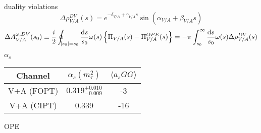 \documentclass{article}
\begin{document}
  duality violations
  \begin{equation}
    \Delta \rho_{V/A}^{DV}(s) = e^{-\delta_{V/A}+\gamma_{V/A}s} \sin(\alpha_{V/A} + \beta_{V/A}s)
  \end{equation}
  \begin{equation}
    \Delta A_{V/A}^{\omega,DV}(s_0) \equiv \frac{i}{2} \oint_{\envert{s_0}=s_0} \frac{\dif s}{s_0} \omega(s) \left\{ \Pi_{V/A}(s) - \Pi_{V/A}^{OPE}(s) \right\} = -\pi \int_{s_0}^\infty \frac{\dif s}{s_0} \omega(s) \Delta \rho_{V/A}^{DV}(s)
  \end{equation}

  $\alpha_s$
  \begin{center}
    \begin{tabular}{| c | c | c |}
      \hline
      Channel & $\alpha_s(m_\tau^2)$ & $\langle a_sGG \rangle$ \\ 
      \hline
      V+A (FOPT) & $0.319^{+0.010}_{-0.009}$ & -3 \\  
      \hline
      V+A (CIPT) & 0.339 & -16 \\    
      \hline
    \end{tabular}
  \end{center}

  OPE
  
\end{document}
